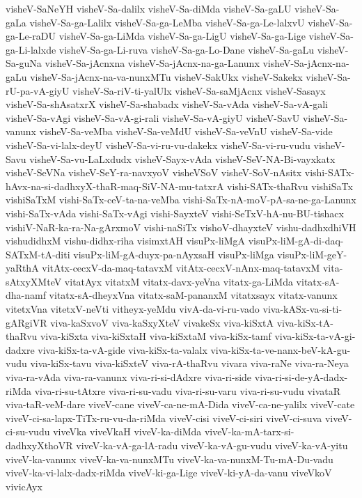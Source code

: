{visheV-SaNeYH
visheV-Sa-dalilx
visheV-Sa-diMda
visheV-Sa-gaLU
visheV-Sa-gaLa
visheV-Sa-ga-Lalilx
visheV-Sa-ga-LeMba
visheV-Sa-ga-Le-lalxvU
visheV-Sa-ga-Le-raDU
visheV-Sa-ga-LiMda
visheV-Sa-ga-LigU
visheV-Sa-ga-Lige
visheV-Sa-ga-Li-lalxde
visheV-Sa-ga-Li-ruva
visheV-Sa-ga-Lo-Dane
visheV-Sa-gaLu
visheV-Sa-guNa
visheV-Sa-jAcnxna
visheV-Sa-jAcnx-na-ga-Lanunx
visheV-Sa-jAcnx-na-gaLu
visheV-Sa-jAcnx-na-va-nunxMTu
visheV-SakUkx
visheV-Sakekx
visheV-Sa-rU-pa-vA-giyU
visheV-Sa-riV-ti-yalUlx
visheV-Sa-saMjAcnx
visheV-Sasayx
visheV-Sa-shAsatxrX
visheV-Sa-shabadx
visheV-Sa-vAda
visheV-Sa-vA-gali
visheV-Sa-vAgi
visheV-Sa-vA-gi-rali
visheV-Sa-vA-giyU
visheV-SavU
visheV-Sa-vanunx
visheV-Sa-veMba
visheV-Sa-veMdU
visheV-Sa-veVnU
visheV-Sa-vide
visheV-Sa-vi-lalx-deyU
visheV-Sa-vi-ru-vu-dakekx
visheV-Sa-vi-ru-vudu
visheV-Savu
visheV-Sa-vu-LaLxdudx
visheV-Sayx-vAda
visheV-SeV-NA-Bi-vayxkatx
visheV-SeVNa
visheV-SeY-ra-navxyoV
visheVSoV
visheV-SoV-nAsitx
vishi-SATx-hAvx-na-si-dadhxyX-thaR-maq-SiV-NA-mu-tatxrA
vishi-SATx-thaRvu
vishiSaTx
vishiSaTxM
vishi-SaTx-ceV-ta-na-veMba
vishi-SaTx-nA-moV-pA-sa-ne-ga-Lanunx
vishi-SaTx-vAda
vishi-SaTx-vAgi
vishi-SayxteV
vishi-SeTxV-hA-nu-BU-tishacx
vishiV-NaR-ka-ra-Na-gArxmoV
vishi-naSiTx
vishoV-dhayxteV
vishu-dadhxdhiVH
vishudidhxM
vishu-didhx-riha
visimxtAH
visuPx-liMgA
visuPx-liM-gA-di-daq-SATxM-tA-diti
visuPx-liM-gA-duyx-pa-nAyxsaH
visuPx-liMga
visuPx-liM-geY-yaRthA
vitAtx-cecxV-da-maq-tatavxM
vitAtx-cecxV-nAnx-maq-tatavxM
vita-sAtxyXMteV
vitatAyx
vitatxM
vitatx-davx-yeVna
vitatx-ga-LiMda
vitatx-sA-dha-namf
vitatx-sA-dheyxVna
vitatx-saM-pananxM
vitatxsayx
vitatx-vanunx
vitetxVna
vitetxV-neVti
vitheyx-yeMdu
vivA-da-vi-ru-vado
viva-kASx-va-si-ti-gARgiVR
viva-kaSxvoV
viva-kaSxyXteV
vivakeSx
viva-kiSxtA
viva-kiSx-tA-thaRvu
viva-kiSxta
viva-kiSxtaH
viva-kiSxtaM
viva-kiSx-tamf
viva-kiSx-ta-vA-gi-dadxre
viva-kiSx-ta-vA-gide
viva-kiSx-ta-valalx
viva-kiSx-ta-ve-nanx-beV-kA-gu-vudu
viva-kiSx-tavu
viva-kiSxteV
viva-rA-thaRvu
vivara
viva-raNe
viva-ra-Neya
viva-ra-vAda
viva-ra-vanunx
viva-ri-si-dAdxre
viva-ri-side
viva-ri-si-de-yA-dadx-riMda
viva-ri-su-tAtxre
viva-ri-su-vadu
viva-ri-su-varu
viva-ri-su-vudu
vivataR
viva-taR-veM-dare
viveV-cane
viveV-ca-ne-mA-Dida
viveV-ca-ne-yalilx
viveV-cate
viveV-ci-sa-lapx-TiTx-ru-vu-da-riMda
viveV-cisi
viveV-ci-siri
viveV-ci-suva
viveV-ci-su-vudu
viveVka
viveVkaH
viveV-ka-diMda
viveV-ka-mA-tarx-si-dadhxyXthoVR
viveV-ka-vA-ga-lA-radu
viveV-ka-vA-gu-vudu
viveV-ka-vA-yitu
viveV-ka-vanunx
viveV-ka-va-nunxMTu
viveV-ka-va-nunxM-Tu-mA-Du-vadu
viveV-ka-vi-lalx-dadx-riMda
viveV-ki-ga-Lige
viveV-ki-yA-da-vanu
viveVkoV
vivicAyx
}
